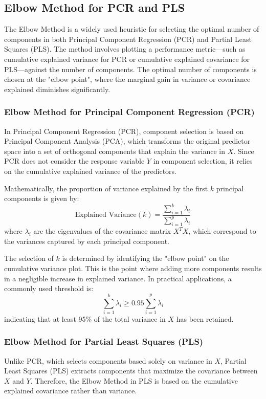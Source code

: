 \documentclass[11pt,twoside,a4paper]{article}
\begin{document}
\subsection{Elbow Method for PCR and PLS}
The Elbow Method is a widely used heuristic for selecting the optimal number of components in both Principal Component Regression (PCR) and Partial Least Squares (PLS). The method involves plotting a performance metric—such as cumulative explained variance for PCR or cumulative explained covariance for PLS—against the number of components. The optimal number of components is chosen at the "elbow point", where the marginal gain in variance or covariance explained diminishes significantly.

\subsubsection{Elbow Method for Principal Component Regression (PCR)}
In Principal Component Regression (PCR), component selection is based on Principal Component Analysis (PCA), which transforms the original predictor space into a set of orthogonal components that explain the variance in \( X \). Since PCR does not consider the response variable \( Y \) in component selection, it relies on the cumulative explained variance of the predictors.

Mathematically, the proportion of variance explained by the first \( k \) principal components is given by:
\begin{equation}
\text{Explained Variance}(k) = \frac{\sum_{i=1}^{k} \lambda_i}{\sum_{i=1}^{p} \lambda_i}
\end{equation}
where \( \lambda_i \) are the eigenvalues of the covariance matrix \( X^T X \), which correspond to the variances captured by each principal component.

The selection of \( k \) is determined by identifying the "elbow point" on the cumulative variance plot. This is the point where adding more components results in a negligible increase in explained variance. In practical applications, a commonly used threshold is:
\begin{equation}
\sum_{i=1}^{k} \lambda_i \geq 0.95 \sum_{i=1}^{p} \lambda_i
\end{equation}
indicating that at least 95\% of the total variance in \( X \) has been retained.

\subsubsection{Elbow Method for Partial Least Squares (PLS)}
Unlike PCR, which selects components based solely on variance in \( X \), Partial Least Squares (PLS) extracts components that maximize the covariance between \( X \) and \( Y \). Therefore, the Elbow Method in PLS is based on the cumulative explained covariance rather than variance.
\end{document}
